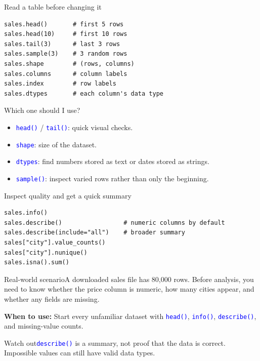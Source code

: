 \documentclass[aspectratio=169,10pt]{beamer}
\newcommand{\scenario}[1]{\begin{block}{Real-world scenario}#1\end{block}}
\newcommand{\whenuse}[1]{\textcolor{CodeGreen}{\textbf{When to use:}} #1}
\newcommand{\pitfall}[1]{\begin{alertblock}{Watch out}#1\end{alertblock}}
\newcommand{\method}[1]{\texttt{\textcolor{Blue}{#1}}}
\begin{document}
\begin{frame}[fragile]{Read a table before changing it}
\begin{lstlisting}
sales.head()       # first 5 rows
sales.head(10)     # first 10 rows
sales.tail(3)      # last 3 rows
sales.sample(3)    # 3 random rows
sales.shape        # (rows, columns)
sales.columns      # column labels
sales.index        # row labels
sales.dtypes       # each column's data type
\end{lstlisting}
\begin{block}{Which one should I use?}
\begin{itemize}
\item \method{head()} / \method{tail()}: quick visual checks.
\item \method{shape}: size of the dataset.
\item \method{dtypes}: find numbers stored as text or dates stored as strings.
\item \method{sample()}: inspect varied rows rather than only the beginning.
\end{itemize}
\end{block}
\end{frame}

\begin{frame}[fragile]{Inspect quality and get a quick summary}
\begin{lstlisting}
sales.info()
sales.describe()                 # numeric columns by default
sales.describe(include="all")    # broader summary
sales["city"].value_counts()
sales["city"].nunique()
sales.isna().sum()
\end{lstlisting}
\scenario{A downloaded sales file has 80,000 rows. Before analysis, you need to know whether the price column is numeric, how many cities appear, and whether any fields are missing.}
\whenuse{Start every unfamiliar dataset with \method{head()}, \method{info()}, \method{describe()}, and missing-value counts.}
\pitfall{\method{describe()} is a summary, not proof that the data is correct. Impossible values can still have valid data types.}
\end{frame}
\end{document}
